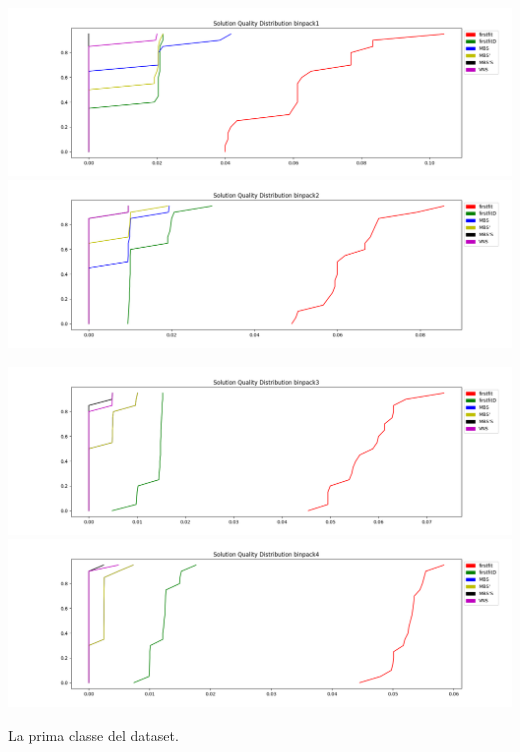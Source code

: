 \documentclass{article}
\begin{document}
\begin{table}[H]
\label{tab1}
\includegraphics[scale=0.23]{pic/binpack1}
\includegraphics[scale=0.23]{pic/binpack2}

\includegraphics[scale=0.23]{pic/binpack3}
\includegraphics[scale=0.23]{pic/binpack4}
\caption{La prima classe del dataset.}
\end{table}
\end{document}
